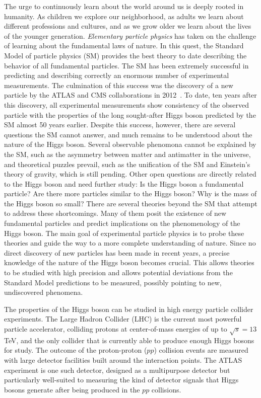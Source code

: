 
The urge to continuously learn about the world around us is deeply rooted in humanity.
As children we explore our neighborhood, as adults we learn about different professions and cultures, and as we grow older we learn about the lives of the younger generation. 
\emph{Elementary particle physics} has taken on the challenge of learning about the fundamental laws of nature. 
In this quest, the Standard Model of particle physics (SM) provides the best theory to date describing the behavior of all fundamental particles. 
The SM has been extremely successful in predicting and describing correctly an enormous number of experimental measurements. 
The culmination of this success was the discovery of a new particle by the ATLAS and CMS collaborations in 2012~\cite{HIGG-2012-27,CMS-HIG-12-028}.
To date, ten years after this discovery, all experimental measurements show consistency of the observed particle with the properties of the long sought-after Higgs boson predicted by the SM almost 50 years earlier.
Despite this success, however, there are several questions the SM cannot answer, and much remains to be understood about the nature of the Higgs boson.
Several observable phenomona cannot be explained by the SM, such as the asymmetry between matter and antimatter in the universe, and theoretical puzzles prevail, such as the unification of the SM and Einstein's theory of gravity, which is still pending.
Other open questions are directly related to the Higgs boson and need further study: Is the Higgs boson a fundamental particle? Are there more particles similar to the Higgs boson? Why is the mass of the Higgs boson so small? 
There are several theories beyond the SM that attempt to address these shortcomings. 
Many of them posit the existence of new fundamental particles and predict implications on the phenomenology of the Higgs boson.
The main goal of experimental particle physics is to probe these theories and guide the way to a more complete understanding of nature.
Since no direct discovery of new particles has been made in recent years, a precise knowledge of the nature of the Higgs boson becomes crucial. 
This allows theories to be studied with high precision and allows potential deviations from the Standard Model predictions to be measured, possibly pointing to new, undiscovered phenomena. 

The properties of the Higgs boson can be studied in high energy particle collider experiments. 
The Large Hadron Collider (LHC) is the current most powerful particle accelerator, colliding protons at center-of-mass energies of up to $\sqrt{s} = 13\,$TeV, and the only collider that is currently able to produce enough Higgs bosons for study.
The outcome of the proton-proton ($pp$) collision events are measured with large detector facilities built around the interaction points. 
The ATLAS experiment is one such detector, designed as a multipurpose detector but particularly well-suited to measuring the kind of detector signals that Higgs bosons generate after being produced in the $pp$ collisions.

